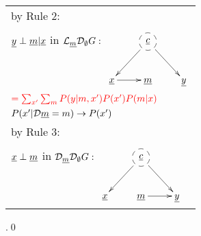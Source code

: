 \begin{longtable}{l}
\quad by Rule 2:
\begin{tabular}{l}
\\
\end{tabular}
\\
\quad
${\underline{y}}\perp{\underline{m}}|{\underline{x}}$ in
${\cal L}_{\underline{m}} {\cal D}_\emptyset G:$
$\xymatrix{
&*++[F-o]{\rvc}\ar[rd]\ar[ld]
\\
\rvx\ar[r]
&\rvm
&\rvy
}$
\\
$\color{red}=
\sum_{x'}
\sum_m
P(y|m, x')
P(x')
P(m|x)$
\\
\quad $P(x'|{\cal D}{\underline{m}}=m)
\rightarrow
P(x')$
\\
\quad by Rule 3:
\begin{tabular}{l}
\\
\end{tabular}
\\
\quad
${\underline{x}}\perp{\underline{m}}$ in
${\cal D}_{\underline{m}} {\cal D}_\emptyset G:$
$\xymatrix{
&*++[F-o]{\rvc}\ar[rd]\ar[ld]
\\
\rvx
&\rvm\ar[r]
&\rvy
}$
\end{longtable}
.\qed


